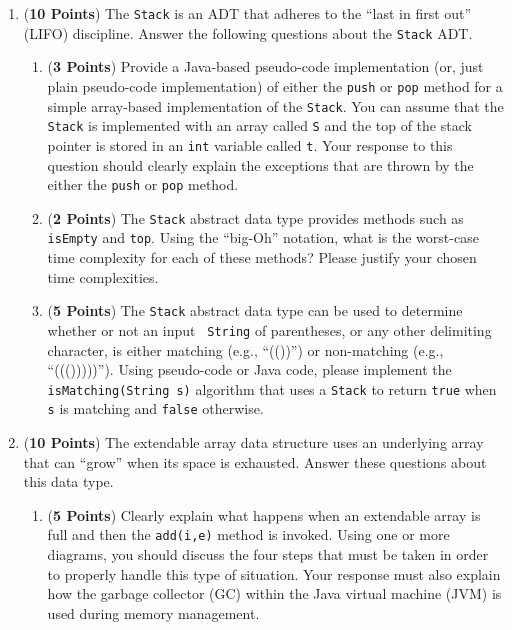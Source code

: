 \documentclass[12pt]{article}
\begin{document}
\begin{enumerate}
\begin{enumerate}
\end{enumerate}

\newpage

\item ({\bf 10 Points}) The {\tt Stack} is an ADT that adheres to the ``last in first out'' (LIFO) discipline.  Answer
the following questions about the {\tt Stack} ADT.

  \begin{enumerate}

  \item ({\bf 3 Points}) Provide a Java-based pseudo-code implementation (or, just plain pseudo-code implementation) of
    either the {\tt push} or {\tt pop} method for a simple array-based implementation of the {\tt Stack}.  You can assume
    that the {\tt Stack} is implemented with an array called {\tt S} and the top of the stack pointer is stored in an
    {\tt int} variable called {\tt t}.  Your response to this question should clearly explain the exceptions that are
    thrown by the either the {\tt push} or {\tt pop} method.

  \item ({\bf 2 Points}) The {\tt Stack} abstract data type provides methods such as {\tt isEmpty} and {\tt top}.  Using
  the ``big-Oh'' notation, what is the worst-case time complexity for each of these methods?  Please justify your chosen
  time complexities.

    \item ({\bf 5 Points}) The {\tt Stack} abstract data type can be used to determine whether or not an input {\tt
        String} of parentheses, or any other delimiting character, is either matching (e.g., ``(())'') or non-matching
      (e.g., ``((()))))'').  Using pseudo-code or Java code, please implement the {\tt isMatching\-(String s)} algorithm
      that uses a {\tt Stack} to return {\tt true} when {\tt s} is matching and {\tt false} otherwise.

  \end{enumerate}

\newpage

\item ({\bf 10 Points}) The extendable array data structure uses an
  underlying array that can ``grow'' when its space is exhausted.
  Answer these questions about this data type.

  \begin{enumerate}

  \item ({\bf 5 Points}) Clearly explain what happens when an
    extendable array is full and then the {\tt add(i,e)} method is
    invoked. Using one or more diagrams, you should discuss the four
    steps that must be taken in order to properly handle this type of
    situation.  Your response must also explain how the garbage
    collector (GC) within the Java virtual machine (JVM) is used
    during memory management.


\end{enumerate}
\end{enumerate}
\end{document}
